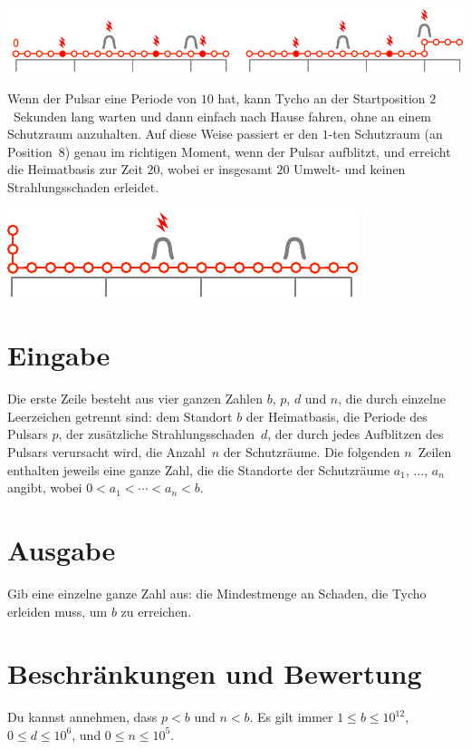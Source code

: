 \includegraphics[width=.8\textwidth]{img/sample1_2.pdf}

Wenn der Pulsar eine Periode von $10$ hat, kann Tycho an der Startposition $2$~Sekunden lang warten und dann einfach nach Hause fahren, ohne an einem Schutzraum anzuhalten.
Auf diese Weise passiert er den $1$-ten Schutzraum (an Position~$8$) genau im richtigen Moment, wenn der Pulsar aufblitzt, und erreicht die Heimatbasis zur Zeit $20$, wobei er insgesamt $20$ Umwelt- und keinen Strahlungsschaden erleidet.

\includegraphics[width=.4\textwidth]{img/sample3.pdf}

\section*{Eingabe}

Die erste Zeile besteht aus vier ganzen Zahlen $b$, $p$, $d$ und $n$, die durch einzelne Leerzeichen getrennt sind:
dem Standort $b$ der Heimatbasis,
die Periode des Pulsars $p$,
der zusätzliche Strahlungsschaden~$d$, der durch jedes Aufblitzen des Pulsars verursacht wird,
die Anzahl~$n$ der Schutzräume.
Die folgenden $n$~Zeilen enthalten jeweils eine ganze Zahl, die die Standorte der Schutzräume $a_1$, $\ldots$, $a_n$ angibt, wobei 
$0<a_1<\cdots <a_n< b$. %

\section*{Ausgabe}

Gib eine einzelne ganze Zahl aus: die Mindestmenge an Schaden, die Tycho erleiden muss, um $b$ zu erreichen.

\section*{Beschränkungen und Bewertung}

Du kannst annehmen, dass
$p < b$ %
und
$n < b$. %
Es gilt immer
$1\leq b\leq 10^{12}$, %
$0\leq d \leq 10^6$, %
und
$0\leq n \leq 10^5$. %

